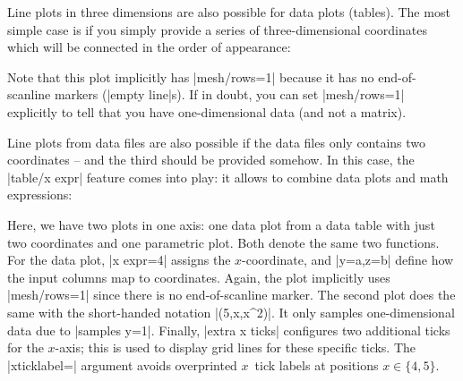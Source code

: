 {Line plots in three dimensions are also possible for data plots (tables). The
most simple case is if you simply provide a series of three-dimensional
coordinates which will be connected in the order of appearance:
%
\begin{codeexample}[]
\end{codeexample}
%
\noindent Note that this plot implicitly has |mesh/rows=1| because it has no
end-of-scanline markers (|empty line|s). If in doubt, you can set |mesh/rows=1|
explicitly to tell \PGFPlots{} that you have one-dimensional data (and not a
matrix).

Line plots from data files are also possible if the data files only contains
two coordinates -- and the third should be provided somehow. In this case, the
|table/x expr| feature comes into play: it allows to combine data plots and
math expressions:
%
\begin{codeexample}[]
\end{codeexample}
%
\noindent Here, we have two plots in one axis: one data plot from a data table
with just two coordinates and one parametric plot. Both denote the same two
functions. For the data plot, |x expr=4| assigns the $x$-coordinate, and
|y=a,z=b| define how the input columns map to coordinates. Again, the plot
implicitly uses |mesh/rows=1| since there is no end-of-scanline marker. The
second plot does the same with the short-handed notation |(5,x,x^2)|. It only
samples one-dimensional data due to |samples y=1|. Finally, |extra x ticks|
configures two additional ticks for the $x$-axis; this is used to display grid
lines for these specific ticks. The |xticklabel=\empty| argument avoids
overprinted $x$~tick labels at positions $x\in\{4,5\}$.

}

